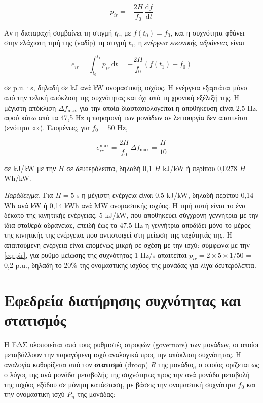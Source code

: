 \begin{equation}
p_{ir} = -\frac{2H}{f_0}\,\frac{\mathrm{d}f}{\mathrm{d}t}
\label{eq:pir}
\end{equation}

Αν η διαταραχή συμβαίνει τη στιγμή $t_0$, με $f(t_0) = f_0$, και η συχνότητα φθάνει στην
ελάχιστη τιμή της (ναδίρ) τη στιγμή $t_1$, η \emph{ενέργεια εικονικής αδράνειας} είναι

\begin{equation}
e_{ir} = \int_{t_0}^{t_1} p_{ir}\,\mathrm{d}t = -\frac{2H}{f_0}\left(f(t_1) - f_0\right)
\label{eq:eir}
\end{equation}

σε p.u.·s, δηλαδή σε kJ ανά kW ονομαστικής ισχύος. Η ενέργεια εξαρτάται μόνο από την τελική
απόκλιση της συχνότητας και όχι από τη χρονική εξέλιξή της. Η μέγιστη απόκλιση
$\Delta f_{\max}$ για την οποία διαστασιολογείται η αποθήκευση είναι 2,5 Hz, αφού κάτω από τα
47,5 Hz η παραμονή των μονάδων σε λειτουργία δεν απαιτείται (ενότητα
«»). Επομένως, για $f_0 = 50$ Hz,

\begin{equation}
e_{ir}^{\max} = \frac{2H}{f_0}\,\Delta f_{\max} = \frac{H}{10}
\label{eq:eir-max}
\end{equation}

σε kJ/kW με την $H$ σε δευτερόλεπτα, δηλαδή 0,1 $H$ kJ/kW ή περίπου 0,0278 $H$ Wh/kW.

\emph{Παράδειγμα.} Για $H = 5$ s η μέγιστη ενέργεια είναι 0,5 kJ/kW, δηλαδή περίπου 0,14 Wh
ανά kW ή 0,14 kWh ανά MW ονομαστικής ισχύος. Η τιμή αυτή είναι το ένα δέκατο της κινητικής
ενέργειας, 5 kJ/kW, που αποθηκεύει σύγχρονη γεννήτρια με την ίδια σταθερά αδράνειας, επειδή
έως τα 47,5 Hz η γεννήτρια αποδίδει μόνο το μέρος της κινητικής της ενέργειας που αντιστοιχεί
στη μείωση της ταχύτητάς της. Η απαιτούμενη ενέργεια είναι επομένως μικρή σε σχέση με την
ισχύ: σύμφωνα με την \eqref{eq:pir}, για ρυθμό μείωσης της συχνότητας 1 Hz/s απαιτείται
$p_{ir} = 2 \times 5 \times 1/50$ = 0,2 p.u., δηλαδή το 20\% της ονομαστικής ισχύος της
μονάδας για λίγα δευτερόλεπτα.

\section{Εφεδρεία διατήρησης συχνότητας και στατισμός}
\label{sec:fcr}

Η ΕΔΣ υλοποιείται από τους ρυθμιστές στροφών (governors) των μονάδων, οι οποίοι μεταβάλλουν
την παραγόμενη ισχύ αναλογικά προς την απόκλιση συχνότητας. Η αναλογία καθορίζεται από τον
\textbf{στατισμό} (droop) $R$ της μονάδας, ο οποίος ορίζεται ως ο λόγος της ανά μονάδα
μεταβολής της συχνότητας προς την ανά μονάδα μεταβολή της ισχύος εξόδου σε μόνιμη κατάσταση,
με βάσεις την ονομαστική συχνότητα $f_0$ και την ονομαστική ισχύ $P_n$ της μονάδας:


